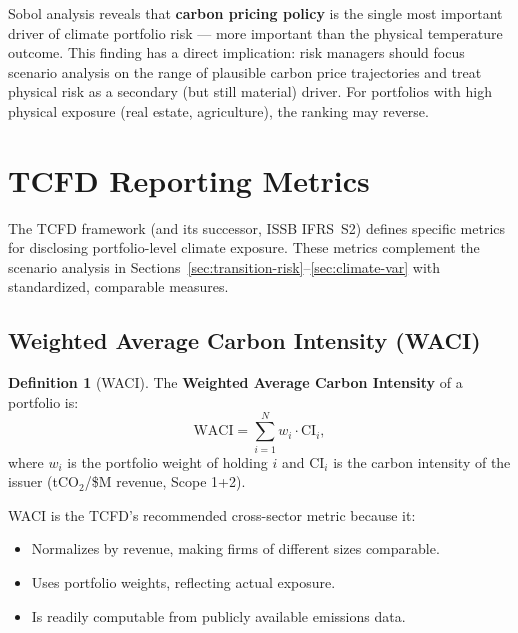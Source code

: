 \documentclass[11pt, a4paper]{article}
\theoremstyle{definition}
\newtheorem{definition}{Definition}[section]
\theoremstyle{plain}
\theoremstyle{remark}
\begin{document}
\begin{keyresult}
Sobol analysis reveals that \textbf{carbon pricing policy} is the single most
important driver of climate portfolio risk --- more important than the physical
temperature outcome.
This finding has a direct implication: risk managers should focus scenario
analysis on the range of plausible carbon price trajectories and treat
physical risk as a secondary (but still material) driver.
For portfolios with high physical exposure (real estate, agriculture), the
ranking may reverse.
\end{keyresult}


\section{TCFD Reporting Metrics}
\label{sec:tcfd}

The TCFD framework (and its successor, ISSB IFRS~S2) defines specific metrics
for disclosing portfolio-level climate exposure.
These metrics complement the scenario analysis in Sections~\ref{sec:transition-risk}--\ref{sec:climate-var}
with standardized, comparable measures.

\subsection{Weighted Average Carbon Intensity (WACI)}

\begin{definition}[WACI]\label{def:waci}
The \textbf{Weighted Average Carbon Intensity} of a portfolio is:
\begin{equation}\label{eq:waci}
    \text{WACI} = \sum_{i=1}^{N} w_i \cdot \text{CI}_i,
\end{equation}
where $w_i$ is the portfolio weight of holding $i$ and $\text{CI}_i$ is the
carbon intensity of the issuer (tCO$_2$/\$M revenue, Scope 1+2).
\end{definition}

WACI is the TCFD's recommended cross-sector metric because it:
\begin{itemize}
    \item Normalizes by revenue, making firms of different sizes comparable.
    \item Uses portfolio weights, reflecting actual exposure.
    \item Is readily computable from publicly available emissions data.
\end{itemize}
\end{document}
